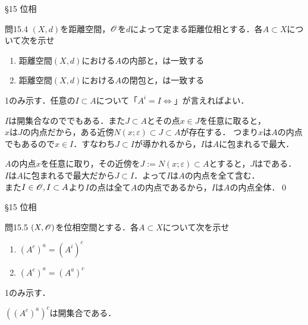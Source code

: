 \documentclass[uplatex,a4paper,dvipdfmx,aspectratio=169,11pt]{beamer}
\begin{document}
\begin{frame}[fragile]{\S 15 位相}
    \begin{exampleblock}{問15.4}
        $(X, d)$を距離空間，$\mathscr{O}$を$d$によって定まる距離位相とする．各$A \subset X$について次を示せ
        \begin{enumerate}
            \item \alert{距離空間$(X, d)$における$A$の内部}と，は一致する
            \item \alert{距離空間$(X, d)$における$A$の閉包}と，は一致する
        \end{enumerate}
    \end{exampleblock}

    \medskip{}

     \quad 1のみ示す．任意の$I \subset A$について「\alert{$A^i = I$}$\iff$」が言えればよい．
   \begin{description}[$\Rightarrow$]
       \item[$(\Rightarrow)$] $I$は\alert{開集合}なのででもある．また$J \subset A$とその点$x \in J$を任意に取ると，\\
           $x$は$J$の\alert{内点}だから，ある近傍$N(x; \varepsilon) \subset J \subset A$が存在する．
           つまり$x$は$A$の\alert{内点}でもあるので$x \in I$．すなわち$J \subset I$が導かれるから，$I$は$A$に包まれるで最大．
       \item[$(\Leftarrow)$] $A$の\alert{内点}$x$を任意に取り，その\alert{近傍}を$J := N(x; \varepsilon) \subset A$とすると，$J$はである．\\
           $I$は$A$に包まれるで最大だから$J \subset I$．よって$I$は$A$の\alert{内点}を全て含む．\\
           また$I \in \mathscr{O},I \subset A$より$I$の点は全て$A$の\alert{内点}であるから，$I$は$A$の\alert{内点}全体．\qed
   \end{description} 

\end{frame}

\begin{frame}[fragile]{\S 15 位相}
    \begin{exampleblock}{問15.5}
        $(X, \mathscr{O})$を位相空間とする．各$A \subset X$について次を示せ
        \begin{enumerate}
            \item $(A^c)^a = (A^i)^c$
            \item $(A^c)^a = (A^a)^c$
        \end{enumerate}
    \end{exampleblock}

    \medskip{}

     \quad 1のみ示す．
   \begin{description}[$(\subset)$]
       \item[$(\subset)$] $((A^c)^a)^c$は開集合である．
       \item[$(\supset)$]
   \end{description} 

\end{frame}
\end{document}
